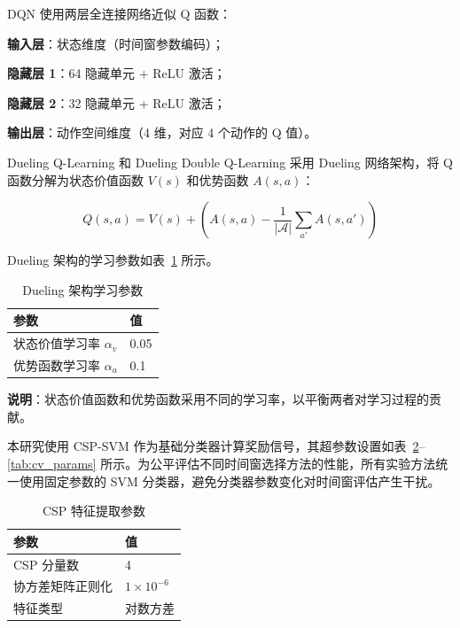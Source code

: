 DQN 使用两层全连接网络近似 Q 函数：

\textbf{输入层}：状态维度（时间窗参数编码）；

\textbf{隐藏层 1}：64 隐藏单元 + ReLU 激活；

\textbf{隐藏层 2}：32 隐藏单元 + ReLU 激活；

\textbf{输出层}：动作空间维度（4 维，对应 4 个动作的 Q 值）。

\label{subsec:dueling_params}

Dueling Q-Learning 和 Dueling Double Q-Learning 采用 Dueling 网络架构，将 Q 函数分解为状态价值函数 $V(s)$ 和优势函数 $A(s,a)$：

\begin{equation}
Q(s, a) = V(s) + \left( A(s, a) - \frac{1}{|\mathcal{A}|} \sum_{a'} A(s, a') \right)
\end{equation}

Dueling 架构的学习参数如表~\ref{tab:dueling_params} 所示。

\begin{table}[H]
\centering
\caption{Dueling 架构学习参数}
\label{tab:dueling_params}
\begin{tabular}{ll}
\hline
\textbf{参数} & \textbf{值} \\
\hline
状态价值学习率 $\alpha_v$ & 0.05 \\
优势函数学习率 $\alpha_a$ & 0.1 \\
\hline
\end{tabular}
\end{table}

\noindent\textbf{说明}：状态价值函数和优势函数采用不同的学习率，以平衡两者对学习过程的贡献。

\label{subsec:csp_svm_params}

本研究使用 CSP-SVM 作为基础分类器计算奖励信号，其超参数设置如表~\ref{tab:csp_params}--\ref{tab:cv_params} 所示。为公平评估不同时间窗选择方法的性能，所有实验方法统一使用固定参数的 SVM 分类器，避免分类器参数变化对时间窗评估产生干扰。

\begin{table}[H]
\centering
\caption{CSP 特征提取参数}
\label{tab:csp_params}
\begin{tabular}{ll}
\hline
\textbf{参数} & \textbf{值} \\
\hline
CSP 分量数 & 4 \\
协方差矩阵正则化 & $1 \times 10^{-6}$ \\
特征类型 & 对数方差 \\
\hline
\end{tabular}
\end{table}

